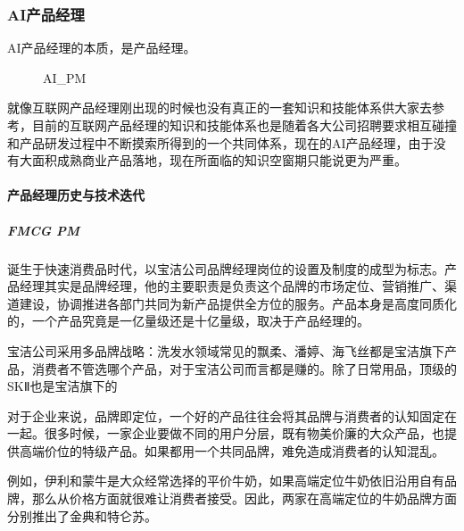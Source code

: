 \documentclass[letterpaper,10pt,english]{sphinxmanual}
\let\sphinxpxdimen\pdfpxdimen\else\newdimen\sphinxpxdimen
\begin{document}
\subsubsection{AI产品经理}
\label{\detokenize{chapter_introduction/AI_PM:ai}}\label{\detokenize{chapter_introduction/AI_PM::doc}}
AI产品经理的本质，是产品经理。

\begin{figure}[H]
\centering
\capstart

\noindent\sphinxincludegraphics[width=400\sphinxpxdimen]{{AI_PM}.png}
\caption{AI\_PM}\label{\detokenize{chapter_introduction/AI_PM:id46}}\end{figure}

就像互联网产品经理刚出现的时候也没有真正的一套知识和技能体系供大家去参考，目前的互联网产品经理的知识和技能体系也是随着各大公司招聘要求相互碰撞和产品研发过程中不断摸索所得到的一个共同体系，现在的AI产品经理，由于没有大面积成熟商业产品落地，现在所面临的知识空窗期只能说更为严重。


\paragraph{产品经理历史与技术迭代}
\label{\detokenize{chapter_introduction/AI_PM:id1}}

\subparagraph{FMCG PM}
\label{\detokenize{chapter_introduction/AI_PM:fmcg-pm}}
诞生于快速消费品时代，以宝洁公司品牌经理岗位的设置及制度的成型为标志。产品经理其实是品牌经理，他的主要职责是负责这个品牌的市场定位、营销推广、渠道建设，协调推进各部门共同为新产品提供全方位的服务。产品本身是高度同质化的，一个产品究竟是一亿量级还是十亿量级，取决于产品经理的。

宝洁公司采用多品牌战略：洗发水领域常见的飘柔、潘婷、海飞丝都是宝洁旗下产品，消费者不管选哪个产品，对于宝洁公司而言都是赚的。除了日常用品，顶级的SK\sphinxhyphen{}Ⅱ也是宝洁旗下的%
\begin{footnote}[260]\sphinxAtStartFootnote
{}
%
\end{footnote}

对于企业来说，品牌即定位，一个好的产品往往会将其品牌与消费者的认知固定在一起。很多时候，一家企业要做不同的用户分层，既有物美价廉的大众产品，也提供高端价位的特级产品。如果都用一个共同品牌，难免造成消费者的认知混乱。

例如，伊利和蒙牛是大众经常选择的平价牛奶，如果高端定位牛奶依旧沿用自有品牌，那么从价格方面就很难让消费者接受。因此，两家在高端定位的牛奶品牌方面分别推出了金典和特仑苏。
\end{document}
